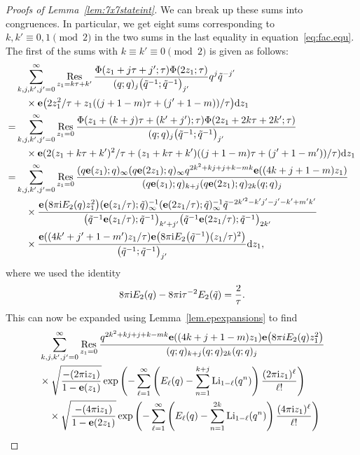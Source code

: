 \documentclass[pdftex]{sigma}
\numberwithin{equation}{section}
\def\tq{\tilde{q}}
\def\Res{\mathrm{Res}}
\def\Li{\mathrm{Li}}
\def\e{\mathbf e}
\def\tq{\tilde{q}}
\def\Res{\mathrm{Res}}
\def\Li{\operatorname{Li}}
\begin{document}
\begin{proof}[Proofs of Lemma~\ref{lem:7x7stateint}]
We can break up these sums into congruences. In particular, we get eight sums corresponding to $k,k'\equiv0,1\pmod{2}$ in the two sums in the last equality in equation~\eqref{eq:fac.equ}. The first of the sums with $k\equiv k'\equiv0\pmod{2}$ is given as follows:
\begin{align*}
 &\sum_{k,j,k',j'=0}^{\infty}\mathop{\Res}\limits_{z_1=k\tau+k'}\frac{\Phi(z_1+j\tau+j';\tau)\Phi(2z_1;\tau)}{(q;q)_{j}\bigl(\tq^{-1};\tq^{-1}\bigr)_{j'}}q^{j}\tq^{-j'}
 \\
 &\quad \times \e\bigl(2z_1^2/\tau+z_1((j+1-m)\tau+(j'+1-m))/\tau\bigr){\rm d}z_1\\
  =&
 \sum_{k,j,k',j'=0}^{\infty}\mathop{\Res}\limits_{z_1=0}\frac{\Phi(z_1+(k+j)\tau+(k'+j');\tau) \Phi(2z_1+2k\tau+2k';\tau)}{(q;q)_{j}\bigl(\tq^{-1};\tq^{-1}\bigr)_{j'}}\\
 &\quad\times\e(2(z_1+k\tau+k')^2/\tau+(z_1+k\tau+k')((j+1-m)\tau+(j'+1-m'))/\tau){\rm d}z_1\\
  =&
 \sum_{k,j,k',j'=0}^{\infty}\mathop{\Res}\limits_{z_1=0}
 \frac{(q\e(z_1);q)_{\infty}(q\e(2z_1);q)_{\infty}q^{2k^2+kj+j+k-mk}\e((4k+j+1-m)z_1)}{(q\e(z_1);q)_{k+j}(q\e(2z_1);q)_{2k}(q;q)_{j}}\\
 &\quad \times\frac{\e\bigl(8\pi {\rm i}E_2(q)z_1^2\bigr)(\e(z_1/\tau);\tq)_{\infty}^{-1}(\e(2z_1/\tau);\tq)_{\infty}^{-1}\tq^{-2k'^2-k'j'-j'-k'+m'k'}}{\bigl(\tq^{-1}\e(z_1/\tau);\tq^{-1}\bigr)_{k'+j'}
 \bigl(\tq^{-1}\e(2z_1/\tau);\tq^{-1}\bigr)_{2k'}}\\
 &\quad \times\frac{\e((4k'+j'+1-m')z_1/\tau)\e\bigl(8\pi {\rm i}E_2\bigl(\tq^{-1}\bigr)(z_1/\tau)^2\bigr)}{\bigl(\tq^{-1};\tq^{-1}\bigr)_{j'}}
 {\rm d}z_1,
\end{align*}
where we used the identity
\[
 8\pi {\rm i}E_2(q)-8\pi {\rm i}\tau^{-2}E_2(\tq) =\frac{2}{\tau} .
\]
This can now be expanded using Lemma~\ref{lem.epexpansions} to find
\begin{align*}
 &\sum_{k,j,k',j'=0}^{\infty}\mathop{\Res}\limits_{z_1=0}
 \frac{q^{2k^2+kj+j+k-mk}\e((4k+j+1-m)z_1)\e\bigl(8\pi iE_2(q)z_1^2\bigr)}{(q;q)_{k+j}(q;q)_{2k}(q;q)_{j}}\\
 & \times\sqrt{\frac{-(2\pi {\rm i}z_1)}{1-\e(z_1)}}\exp\left(-\sum_{\ell=1}^{\infty}\left(E_{\ell}(q)-\sum_{n=1}^{k+j}\Li_{1-\ell}(q^{n})\right)\frac{(2\pi {\rm i}z_1)^\ell}{\ell!}\right)\\
 &\quad\times\sqrt{\frac{-(4\pi {\rm i}z_1)}{1-\e(2z_1)}}\exp\left(-\sum_{\ell=1}^{\infty}\left(E_{\ell}(q)-\sum_{n=1}^{2k}\Li_{1-\ell}(q^{n})\right)\frac{(4\pi {\rm i} z_1)^\ell}{\ell!}\right)\\

\end{align*}
\end{proof}
\end{document}
